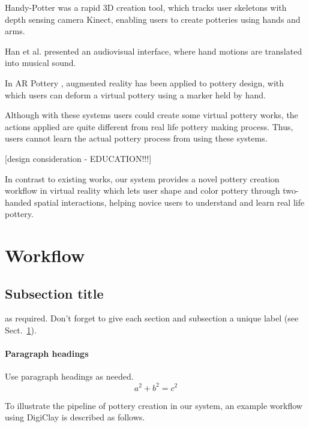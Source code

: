 
Handy-Potter \cite{murugappan2013handy} was a rapid 3D creation tool, which tracks user skeletons with depth sensing camera Kinect, enabling users to create potteries using hands and arms.


Han et al. \cite{han2014virtual} presented an audiovisual interface, where hand motions are translated into musical sound.

In AR Pottery \cite{han2007ar}, augmented reality has been applied to pottery design, with which users can deform a virtual pottery using a marker held by hand.

Although with these systems users could create some virtual pottery works, the actions applied are quite different from real life pottery making process. Thus, users cannot learn the actual pottery process from using these systems.

[design consideration - EDUCATION!!!]

In contrast to existing works, our system provides a novel pottery creation workflow in virtual reality which lets user shape and color pottery through two-handed spatial interactions, helping novice users to understand and learn real life pottery.



\section{Workflow}
\label{sec:1}

\subsection{Subsection title}
\label{sec:2}
as required. Don't forget to give each section
and subsection a unique label (see Sect.~\ref{sec:1}).
\paragraph{Paragraph headings} Use paragraph headings as needed.
\begin{equation}
a^2+b^2=c^2
\end{equation}









To illustrate the pipeline of pottery creation in our system, an example workflow using DigiClay is described as follows.

